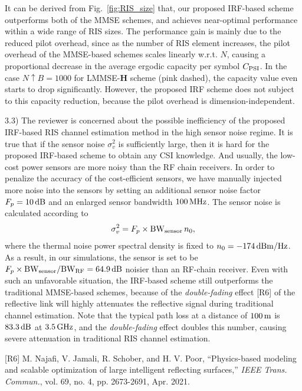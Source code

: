 \documentclass[a4paper,12pt]{article}
\begin{document}
{{It can be derived from {Fig.~\ref{fig:RIS_size}} that, our proposed IRF-based scheme outperforms both of the MMSE schemes, and achieves near-optimal performance within a wide range of RIS sizes. The performance gain is mainly due to the reduced pilot overhead, since as the number of RIS element increases, the pilot overhead of the MMSE-based schemes scales linearly w.r.t. $N$, causing a proportional decrease in the average ergodic capacity per symbol $C_{\rm PSI}$. In the case $N\uparrow B=1000$ for LMMSE-$\bm H$ scheme (pink dashed), the capacity value even starts to drop significantly. However, the proposed IRF scheme does not subject to this capacity reduction, because the pilot overhead is dimension-independent.  


3.3) The reviewer is concerned about the possible inefficiency of the proposed IRF-based RIS channel estimation method in the high sensor noise regime. It is true that if the sensor noise $\sigma_v^2$ is sufficiently large, then it is hard for the proposed IRF-based scheme to obtain any CSI knowledge. And usually, the low-cost power sensors are more noisy than the RF chain receivers. In order to penalize the accuracy of the cost-efficient sensors, we have manually injected more noise into the sensors by setting an additional sensor noise factor $F_p=10\,{\rm dB}$ and an enlarged sensor bandwidth $100\,{\rm MHz}$. The sensor noise is calculated according to 
\begin{equation*}
    \sigma_v^2 = F_p \times {\rm BW}_{\rm sensor}\, n_0,
\end{equation*}
where the thermal noise power spectral density is fixed to $n_0 =-174\,{\rm dBm/Hz}$. As a result, in our simulations, the sensor is set to be $F_p \times {\rm BW}_{\rm sensor}/{\rm BW}_{\rm RF} = 64.9\,{\rm dB}$ noisier than an RF-chain receiver. Even with such an unfavorable situation, the IRF-based scheme still outperforms the traditional MMSE-based schemes, because of the {\it double-fading} effect [R6] of the reflective link will highly attenuates the reflective signal during traditional channel estimation. Note that the typical path loss at a distance of $100\,{\rm m}$ is $83.3\,{\rm dB}$ at $3.5\,{\rm GHz}$, and the {\it double-fading} effect doubles this number, causing severe attenuation in traditional RIS channel estimation. 

[R6] M. Najafi, V. Jamali, R. Schober, and H. V. Poor, ``Physics-based modeling and scalable optimization of large intelligent reflecting surfaces,'' {\it IEEE Trans. Commun.}, vol. 69, no. 4, pp. 2673-2691, Apr. 2021.

}}
\end{document}

